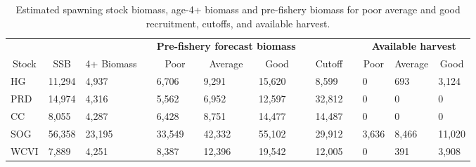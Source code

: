 %
\begin{table}[!tbp]
 \small
 \caption{Estimated spawning stock biomass,  age-4+ biomass and pre-fishery
			biomass for poor average and good recruitment,  cutoffs,  and 
			available harvest.\label{TableCatchAdvice}} 
 \begin{center}
 \begin{tabular}{lllclllclclll}\hline\hline
\multicolumn{3}{c}{\bfseries }&
\multicolumn{1}{c}{\bfseries }&
\multicolumn{3}{c}{\bfseries Pre-fishery forecast biomass}&
\multicolumn{1}{c}{\bfseries }&
\multicolumn{1}{c}{\bfseries }&
\multicolumn{1}{c}{\bfseries }&
\multicolumn{3}{c}{\bfseries Available harvest}
\tabularnewline \cline{1-13}
\multicolumn{1}{c}{Stock}&\multicolumn{1}{c}{SSB}&\multicolumn{1}{c}{4+ Biomass}&\multicolumn{1}{c}{}&\multicolumn{1}{c}{Poor}&\multicolumn{1}{c}{Average}&\multicolumn{1}{c}{Good}&\multicolumn{1}{c}{}&\multicolumn{1}{c}{Cutoff}&\multicolumn{1}{c}{}&\multicolumn{1}{c}{Poor}&\multicolumn{1}{c}{Average}&\multicolumn{1}{c}{Good}\tabularnewline
\hline
HG&11,294& 4,937&& 6,706& 9,291&15,620&& 8,599&&     0&   693& 3,124\tabularnewline
PRD&14,974& 4,316&& 5,562& 6,952&12,597&&32,812&&     0&     0&     0\tabularnewline
CC& 8,055& 4,287&& 6,428& 8,751&14,477&&14,487&&     0&     0&     0\tabularnewline
SOG&56,358&23,195&&33,549&42,332&55,102&&29,912&& 3,636& 8,466&11,020\tabularnewline
WCVI& 7,889& 4,251&& 8,387&12,396&19,542&&12,005&&     0&   391& 3,908\tabularnewline
\hline
\end{tabular}

\end{center}

\end{table}

